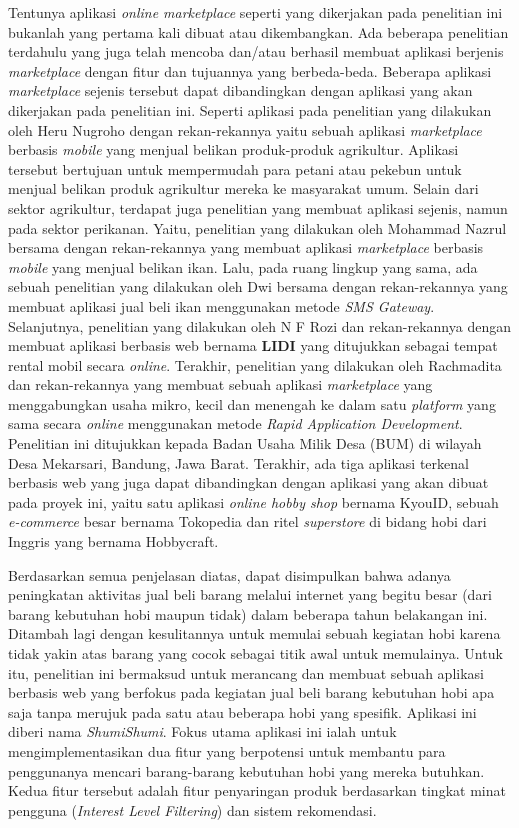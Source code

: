 \documentclass[a4paper]{article}
\begin{document}
Tentunya aplikasi \textit{online marketplace} seperti yang dikerjakan pada penelitian ini bukanlah yang pertama kali dibuat atau dikembangkan. Ada beberapa penelitian terdahulu yang juga telah mencoba dan/atau berhasil membuat aplikasi berjenis \textit{marketplace} dengan fitur dan tujuannya yang berbeda-beda. Beberapa aplikasi \textit{marketplace} sejenis tersebut dapat dibandingkan dengan aplikasi yang akan dikerjakan pada penelitian ini. Seperti aplikasi pada penelitian yang dilakukan oleh Heru Nugroho dengan rekan-rekannya yaitu sebuah aplikasi \textit{marketplace} berbasis \textit{mobile} yang menjual belikan produk-produk agrikultur. Aplikasi tersebut bertujuan untuk mempermudah para petani atau pekebun untuk menjual belikan produk agrikultur mereka ke masyarakat umum\autocite{agriculture-marketplace}. Selain dari sektor agrikultur, terdapat juga penelitian yang membuat aplikasi sejenis, namun pada sektor perikanan. Yaitu, penelitian yang dilakukan oleh Mohammad Nazrul bersama dengan rekan-rekannya yang membuat aplikasi \textit{marketplace} berbasis \textit{mobile} yang menjual belikan ikan\autocite[1-10]{fishes-marketplace}. Lalu, pada ruang lingkup yang sama, ada sebuah penelitian yang dilakukan oleh Dwi bersama dengan rekan-rekannya yang membuat aplikasi jual beli ikan menggunakan metode \textit{SMS Gateway}\autocite{c2c-fish-marketplace}. Selanjutnya, penelitian yang dilakukan oleh N F Rozi dan rekan-rekannya dengan membuat aplikasi berbasis web bernama \textbf{LIDI} yang ditujukkan sebagai tempat rental mobil secara \textit{online}\autocite{lidi-car-rental}. Terakhir, penelitian yang dilakukan oleh Rachmadita dan rekan-rekannya yang membuat sebuah aplikasi \textit{marketplace} yang menggabungkan usaha mikro, kecil dan menengah ke dalam satu \textit{platform} yang sama secara \textit{online} menggunakan metode \textit{Rapid Application Development}. Penelitian ini ditujukkan kepada Badan Usaha Milik Desa (BUM) di wilayah Desa Mekarsari, Bandung, Jawa Barat\autocite{bum-mekarsari}. Terakhir, ada tiga aplikasi terkenal berbasis web yang juga dapat dibandingkan dengan aplikasi yang akan dibuat pada proyek ini, yaitu satu aplikasi \textit{online hobby shop} bernama KyouID, sebuah \textit{e-commerce} besar bernama Tokopedia dan ritel \textit{superstore} di bidang hobi dari Inggris yang bernama Hobbycraft.

Berdasarkan semua penjelasan diatas, dapat disimpulkan bahwa adanya peningkatan aktivitas jual beli barang melalui internet yang begitu besar (dari barang kebutuhan hobi maupun tidak) dalam beberapa tahun belakangan ini. Ditambah lagi dengan kesulitannya untuk memulai sebuah kegiatan hobi karena tidak yakin atas barang yang cocok sebagai titik awal untuk memulainya. Untuk itu, penelitian ini bermaksud untuk merancang dan membuat sebuah aplikasi berbasis web yang berfokus pada kegiatan jual beli barang kebutuhan hobi apa saja tanpa merujuk pada satu atau beberapa hobi yang spesifik. Aplikasi ini diberi nama \textit{ShumiShumi}. Fokus utama aplikasi ini ialah untuk mengimplementasikan dua fitur yang berpotensi untuk membantu para penggunanya mencari barang-barang kebutuhan hobi yang mereka butuhkan. Kedua fitur tersebut adalah fitur penyaringan produk berdasarkan tingkat minat pengguna (\textit{Interest Level Filtering}) dan sistem rekomendasi.
\end{document}
